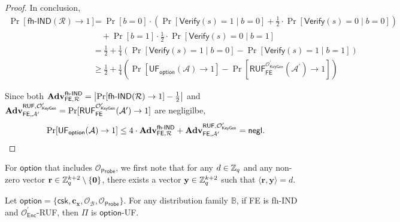 \begin{proof}
In conclusion,
\begin{align*}
	\Pr[\textsf{fh-IND}(\mathcal{R}) \to 1] 
	&= \Pr[b = 0] \cdot \left( \Pr[\textsf{Verify}(s) = 1 \mid b = 0] + \frac{1}{2} \cdot \Pr[\textsf{Verify}(s) = 0 \mid b = 0] \right) \\
	&\quad + \Pr[b = 1] \cdot \frac{1}{2} \cdot \Pr[\textsf{Verify}(s) = 0 \mid b = 1] \\
	&= \frac{1}{2} + \frac{1}{4} \left( \Pr[\textsf{Verify}(s) = 1 \mid b = 0] - \Pr[\textsf{Verify}(s) = 1 \mid b = 1] \right) \\
	&\geq \frac{1}{2} + \frac{1}{4} \left( \Pr[\textsf{UF}_\textsf{option}(\mathcal{A}) \to 1] - \Pr[\textsf{RUF}^{\mathcal{O}^\prime_{\textsf{KeyGen}}}_{\textsf{FE}}(\mathcal{A}^\prime) \to 1 ] \right)
\end{align*}

\noindent Since both $\mathbf{Adv}_{\textsf{FE}, \mathcal{R}}^\textsf{fh-IND} = \left| \Pr[\textsf{fh-IND}(\mathcal{R}) \to 1] - \frac{1}{2} \right|$ and $\mathbf{Adv}_{\textsf{FE}, \mathcal{A}^\prime}^{\textsf{RUF},\mathcal{O}^\prime_{\textsf{KeyGen}}} = \Pr[\textsf{RUF}^{\mathcal{O}^\prime_{\textsf{KeyGen}}}_{\textsf{FE}}(\mathcal{A}^\prime) \to 1 ]$ are negligilbe,
\[
	\Pr[\textsf{UF}_\textsf{option}(\mathcal{A}) \to 1] \leq 4 \cdot \mathbf{Adv}_{\textsf{FE}, \mathcal{R}}^\textsf{fh-IND} + \mathbf{Adv}_{\textsf{FE}, \mathcal{A}^\prime}^{\textsf{RUF},\mathcal{O}^\prime_{\textsf{KeyGen}}} = \mathsf{negl}.
\]

\end{proof}


For $\textsf{option}$ that includes $\mathcal{O}_{\textsf{Probe}}$, we first note that for any $d \in \mathbb{Z}_q$ and any non-zero vector $\mathbf{r} \in \mathbb{Z}_q^{k+2} \setminus \{\mathbf{0}\}$, there exists a vector $\mathbf{y} \in \mathbb{Z}_q^{k+2}$ such that $\langle \mathbf{r}, \mathbf{y} \rangle = d$.

\begin{theorem}
\label{thm:fh-IPFE:ind-ruf-OB-Probe}
	Let $\textsf{option} = \{\textsf{csk}, \mathbf{c_x}, \mathcal{O}_\mathcal{B}, \mathcal{O}_\textsf{Probe}\}$. For any distribution family $\mathbb{B}$, if \textsf{FE} is fh-IND and $\mathcal{O}^\prime_{\textsf{Enc}}$-RUF, then $\Pi$ is $\textsf{option}$-UF. 
\end{theorem}


